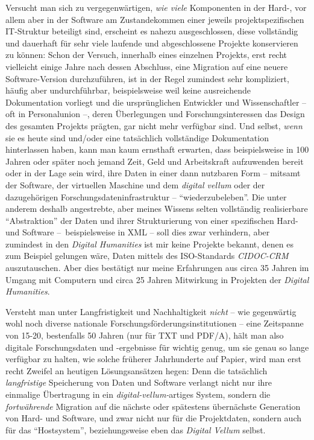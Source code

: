 \documentclass[a4paper,
fontsize=11pt,
oneside,
numbers=noperiodatend,
parskip=half-,
bibliography=totoc,
final
]{scrartcl}
\begin{document}
Versucht man sich zu vergegenwärtigen, \emph{wie viele} Komponenten in
der Hard-, vor allem aber in der Software am Zustandekommen einer
jeweils projektspezifischen IT-Struktur beteiligt sind, erscheint es
nahezu ausgeschlossen, diese vollständig und dauerhaft für sehr viele
laufende und abgeschlossene Projekte konservieren zu können: Schon der
Versuch, innerhalb eines einzelnen Projekts, erst recht vielleicht
einige Jahre nach dessen Abschluss, eine Migration auf eine neuere
Software-Version durchzuführen, ist in der Regel zumindest sehr
kompliziert, häufig aber undurchführbar, beispielsweise weil keine
ausreichende Dokumentation vorliegt und die ursprünglichen Entwickler
und Wissenschaftler -- oft in Personalunion --, deren Überlegungen und
Forschungsinteressen das Design des gesamten Projekts prägten, gar nicht
mehr verfügbar sind. Und selbst, \emph{wenn} sie es heute sind und/oder
eine tatsächlich vollständige Dokumentation hinterlassen haben, kann man
kaum ernsthaft erwarten, dass beispielsweise in 100 Jahren oder später
noch jemand Zeit, Geld und Arbeitskraft aufzuwenden bereit oder in der
Lage sein wird, ihre Daten in einer dann nutzbaren Form -- mitsamt der
Software, der virtuellen Maschine und dem \emph{digital vellum} oder der
dazugehörigen Forschungsdateninfrastruktur -- \enquote{wiederzubeleben}.
Die unter anderem deshalb angestrebte, aber meines Wissens selten
vollständig realisierbare \enquote{Abstraktion} der Daten und ihrer
Strukturierung von einer spezifischen Hard- und Software
--~beispielsweise in XML -- soll dies zwar verhindern, aber zumindest in
den \emph{Digital Humanities} ist mir keine Projekte bekannt, denen es
zum Beispiel gelungen wäre, Daten mittels des ISO-Standards
\emph{CIDOC-CRM} auszutauschen. Aber dies bestätigt nur meine
Erfahrungen aus circa 35 Jahren im Umgang mit Computern und circa 25
Jahren Mitwirkung in Projekten der \emph{Digital Humanities}.

Versteht man unter Langfristigkeit und Nachhaltigkeit \emph{nicht} --
wie gegenwärtig wohl noch diverse nationale
Forschungsförderungsinstitutionen -- eine Zeitspanne von 15-20,
bestenfalls 50 Jahren (nur für TXT und PDF/A), hält man also digitale
Forschungsdaten und -ergebnisse für wichtig genug, um sie genau so lange
verfügbar zu halten, wie solche früherer Jahrhunderte auf Papier, wird
man erst recht Zweifel an heutigen Lösungsansätzen hegen: Denn die
tatsächlich \emph{langfristige} Speicherung von Daten und Software
verlangt nicht nur ihre einmalige Übertragung in ein
\emph{digital-vellum-}artiges System, sondern die \emph{fortwährende}
Migration auf die nächste oder spätestens übernächste Generation von
Hard- und Software, und zwar nicht nur für die Projektdaten, sondern
auch für das \enquote{Hostsystem}, beziehungsweise eben das
\emph{Digital Vellum} selbst.
\end{document}
